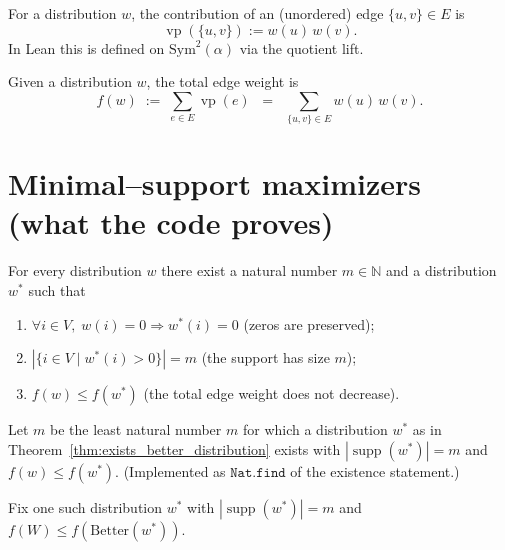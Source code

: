 \begin{definition}\label{def:edge_contribution}
For a distribution \(w\), the contribution of an (unordered) edge
\(\{u,v\}\in E\) is
\[
  \operatorname{vp}(\{u,v\}) := w(u)\,w(v).
\]
In Lean this is defined on \(\mathrm{Sym}^2(\alpha)\) via the quotient lift.
\leanok
\end{definition}

\begin{definition}\label{def:total_edge_weight}
Given a distribution \(w\), the total edge weight is
\[
  f(w) \;:=\; \sum_{e\in E} \operatorname{vp}(e)
  \;\;=\;\; \sum_{\{u,v\}\in E} w(u)\,w(v).
\]
\leanok
\end{definition}

\section{Minimal–support maximizers (what the code proves)}

\begin{theorem}
\label{thm:exists_better_distribution}
For every distribution \(w\) there exist a natural number \(m\in\mathbb N\) and a
distribution \(w^*\) such that
\begin{enumerate}
  \item \(\forall i\in V,\; w(i)=0 \Rightarrow w^*(i)=0\) \quad (zeros are preserved);
  \item \(|\{i\in V\mid w^*(i)>0\}| = m\) \quad (the support has size \(m\));
  \item \(f(w)\le f(w^*)\) \quad (the total edge weight does not decrease).
\end{enumerate}
\end{theorem}

\begin{definition}
\label{def:m}
Let \(m\) be the least natural number \(m\) for which a distribution
\(w^*\) as in Theorem~\ref{thm:exists_better_distribution} exists with
\(|\operatorname{supp}(w^*)|=m\) and \(f(w)\le f(w^*)\).
(Implemented as \(\texttt{Nat.find}\) of the existence statement.)
\leanok
\end{definition}

\begin{definition}
\label{def:Better}
Fix one such distribution \(w^*\) with
\(|\operatorname{supp}(w^*)|=m\) and \(f(W)\le f(\mathrm{Better}(w^*))\).
\leanok
\end{definition}

